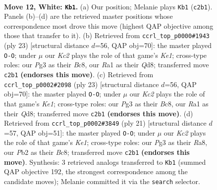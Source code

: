 \documentclass[11pt]{article}
\begin{document}
\clearpage

\begin{figure}[p]\centering
\begin{subfigure}{0.46\textwidth}\centering
\resizebox{\linewidth}{!}{%
\newchessgame
\chessboard[
  setfen={r1b1k2r/2p1qpp1/2n2n2/pp1p3p/3P4/2B2NPP/PPK1PP2/R2Q1B1R w kq - 0 12},
  showmover=false,
  pgfstyle=straightmove, color=movearrow, markmove={c2-b1}
]}
\caption{}
\end{subfigure}\hfill
\begin{subfigure}{0.46\textwidth}\centering
\resizebox{\linewidth}{!}{%
\newchessgame
\chessboard[
  setfen={r1bqk2r/2p1npb1/p5pp/1p1pP3/3P4/2N2N2/PPB2PPP/R2QK2R b KQkq - 0 12},
  showmover=false,
  pgfstyle=straightmove, color=movearrow, markmove={e8-g8}
]}
\caption{}
\end{subfigure}
\\[4pt]
\begin{subfigure}{0.46\textwidth}\centering
\resizebox{\linewidth}{!}{%
\newchessgame
\chessboard[
  setfen={r1bqk2r/2p1npb1/p5pp/1p1pP3/3P4/2N2N2/PPB2PPP/R2QK2R b KQkq - 0 12},
  showmover=false,
  pgfstyle=straightmove, color=movearrow, markmove={e8-g8}
]}
\caption{}
\end{subfigure}\hfill
\begin{subfigure}{0.46\textwidth}\centering
\resizebox{\linewidth}{!}{%
\newchessgame
\chessboard[
  setfen={r1b1k2r/ppq1bp1p/2nppp2/P7/4P3/1NN5/1PPQ1PPP/R3KB1R b KQkq - 2 11},
  showmover=false,
  pgfstyle=straightmove, color=movearrow, markmove={e8-g8}
]}
\caption{}
\end{subfigure}
\caption{\textbf{Move 12, White: \texttt{Kb1}.} (a) Our position; Melanie plays \texttt{Kb1} (\texttt{c2b1}). Panels (b)--(d) are the retrieved master positions whose correspondence most drove this move (highest QAP objective among those that transfer to it). (b) Retrieved from \texttt{ccrl\_top\_p0000\#1943} (ply 23) [structural distance $d$=56, QAP obj=70]: the master played \texttt{O-O}; under $\mu$ our \emph{Kc2} plays the role of that game's \emph{Ke1}; cross-type roles: our \emph{P}g3 as their \emph{B}c8, our \emph{R}a1 as their \emph{Q}d8; transferred move \texttt{c2b1} \textbf{(endorses this move)}. (c) Retrieved from \texttt{ccrl\_top\_p0002\#2098} (ply 23) [structural distance $d$=56, QAP obj=70]: the master played \texttt{O-O}; under $\mu$ our \emph{Kc2} plays the role of that game's \emph{Ke1}; cross-type roles: our \emph{P}g3 as their \emph{B}c8, our \emph{R}a1 as their \emph{Q}d8; transferred move \texttt{c2b1} \textbf{(endorses this move)}. (d) Retrieved from \texttt{ccrl\_top\_p0002\#3849} (ply 21) [structural distance $d$=57, QAP obj=51]: the master played \texttt{O-O}; under $\mu$ our \emph{Kc2} plays the role of that game's \emph{Ke1}; cross-type roles: our \emph{P}g3 as their \emph{R}a8, our \emph{P}b2 as their \emph{B}c8; transferred move \texttt{c2b1} \textbf{(endorses this move)}. Synthesis: 3 retrieved analogs transferred to \texttt{Kb1} (summed QAP objective 192, the strongest correspondence among the candidate moves); Melanie committed it via the \texttt{search} selector.}
\label{fig:thought-m22}
\end{figure}
\end{document}
